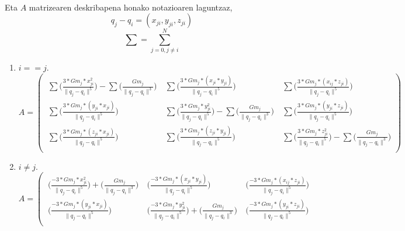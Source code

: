 \paragraph*{}Eta $A$ matrizearen deskribapena honako notazioaren laguntzaz,
\begin{equation*}
q_j-q_i=(x_{ji},y_{ji},z_{ji})
\end{equation*}
\begin{equation*}
\sum = \sum_{j=0,j \neq i}^{N}
\end{equation*}


\begin{enumerate}
\item $i==j$.\\
\begin{equation*}
A=\left(\begin{array}{ccc}
  \ \sum \bigg(\frac{3*Gm_j*x_{ji}^2}{\|q_j-q_i\|^5}\bigg)-
    \sum \bigg(\frac{Gm_j}{\|q_j-q_i\|^3} \bigg)& 
  \ \sum \bigg(\frac{3*Gm_j*(x_{ji}*y_{ji})}{\|q_j-q_i\|^5}\bigg)& 
  \ \sum \bigg(\frac{3*Gm_j*(x_{ij}*z_{ji})}{\|q_j-q_i\|^5}\bigg) \\
  
  \ \sum \bigg(\frac{3*Gm_j*(y_{ji}*x_{ji})}{\|q_j-q_i\|^5}\bigg)& 
  \ \sum \bigg(\frac{3*Gm_j*y_{ji}^2}{\|q_j-q_i\|^5}\bigg)-
          \sum \bigg(\frac{Gm_j}{\|q_j-q_i\|^3} \bigg)& 
    \ \sum \bigg(\frac{3*Gm_j*(y_{ji}*z_{ji})}{\|q_j-q_i\|^5}\bigg) \\
  
   \ \sum \bigg(\frac{3*Gm_j*(z_{ji}*x_{ji})}{\|q_j-q_i\|^5}\bigg)& 
   \ \sum \bigg(\frac{3*Gm_j*(z_{ji}*y_{ji})}{\|q_j-q_i\|^5}\bigg)& 
   \ \sum \bigg(\frac{3*Gm_j*z_{ji}^2}{\|q_j-q_i\|^5}\bigg)-
     \sum \bigg(\frac{Gm_j}{\|q_j-q_i\|^3} \bigg) \\
  
\end{array}\right)
\end{equation*}

\item $i \neq j$. \\
\begin{equation*}
A=\left(\begin{array}{ccc}
  \ \bigg(\frac{-3*Gm_j*x_{ji}^2}{\|q_j-q_i\|^5}\bigg)+
    \bigg(\frac{Gm_j}{\|q_j-q_i\|^3} \bigg)& 
  \ \bigg(\frac{-3*Gm_j*(x_{ji}*y_{ji})}{\|q_j-q_i\|^5}\bigg)& 
  \ \bigg(\frac{-3*Gm_j*(x_{ij}*z_{ji})}{\|q_j-q_i\|^5}\bigg) \\

  \ \bigg(\frac{-3*Gm_j*(y_{ji}*x_{ji})}{\|q_j-q_i\|^5}\bigg)& 
  \ \bigg(\frac{-3*Gm_j*y_{ji}^2}{\|q_j-q_i\|^5}\bigg)+
    \bigg(\frac{Gm_j}{\|q_j-q_i\|^3} \bigg)& 
  \ \bigg(\frac{-3*Gm_j*(y_{ji}*z_{ji})}{\|q_j-q_i\|^5}\bigg) \\
  

\end{array}
\end{equation*}
\end{enumerate}
